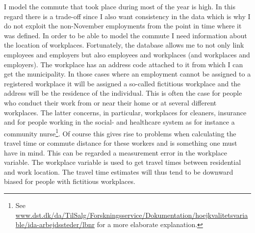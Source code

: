 I model the commute that took place during most of the year is high. In this regard there is a trade-off since I also want consistency in the data which is why I do not exploit the non-November employments from the point in time where it was defined. In order to be able to model the commute I need information about the location of workplaces. Fortunately, the database allows me to not only link employees and employers but also employees and workplaces (and workplaces and employers). The workplace has an address code attached to it from which I can get the municipality. In those cases where an employment cannot be assigned to a registered workplace it will be assigned a so-called fictitious workplace and the address will be the residence of the individual. This is often the case for people who conduct their work from or near their home or at several different workplaces. The latter concerns, in particular, workplaces for cleaners, insurance and for people working in the social- and healthcare system as for instance a community nurse\footnote{See \url{www.dst.dk/da/TilSalg/Forskningsservice/Dokumentation/hoejkvalitetsvariable/ida-arbejdssteder/lbnr} for a more elaborate explanation.}. Of course this gives rise to problems when calculating the travel time or commute distance for these workers and is something one must have in mind. This can be regarded a measurement error in the workplace variable. The workplace variable is used to get travel times between residential and work location. The travel time estimates will thus tend to be downward biased for people with fictitious workplaces. 

